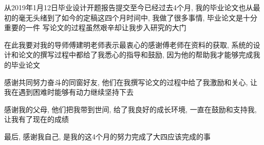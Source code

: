 
\acknowledgement
{}
从2019年1月12日毕业设计开题报告提交至今已经过去4个月, 我的毕业论文也从最初的毫无头绪到了如今的定稿\juhao 这四个月时间中, 我做了很多事情, 毕业论文是十分重要的一件\juhao
写论文的过程虽然艰辛却让我步入研究的大门\juhao 

在此我要对我的导师傅建明老师表示最衷心的感谢\juhao 傅老师在资料的获取, 系统的设计和论文的撰写过程中都给了我悉心的指导和鼓励, 因为他的帮助我才能够完成我的毕业论文\juhao 

感谢共同努力奋斗的同窗好友, 他们在我撰写论文的过程中给了我激励和关心, 让我在遇到困难时能够有动力继续坚持下去\juhao

感谢我的父母, 他们把我带到世间, 给了我良好的成长环境, 一直在鼓励和支持我, 让我有了现在的成绩\juhao 

最后, 感谢我自己, 是我的这4个月的努力完成了大四应该完成的事\juhao 












